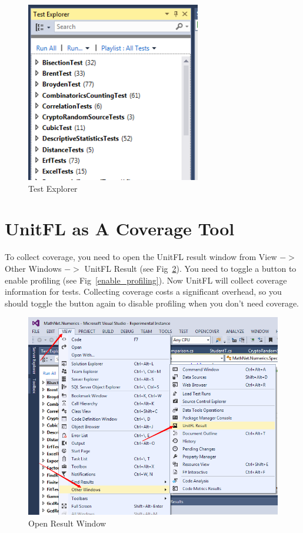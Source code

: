 \documentclass[11pt]{article} %
\begin{document}
\begin{figure}
	\centering
	\includegraphics[width=3in]{test_explorer}
	\caption{Test Explorer}
	\label{test_explorer}
\end{figure}

\section{UnitFL as A Coverage Tool}
To collect coverage, you need to open the UnitFL result window from View $->$ Other Windows $->$ UnitFL Result (see Fig~\ref{open_result}).
You need to toggle a button to enable profiling (see Fig~\ref{enable_profiling}). Now UnitFL will collect coverage information for tests. 
Collecting coverage costs a significant overhead, so you should toggle the button again to disable profiling when you don't need coverage.

\begin{figure}
	\centering
	\includegraphics[width=6in]{open_result}
	\caption{Open Result Window}
	\label{open_result}
\end{figure}
\end{document}
